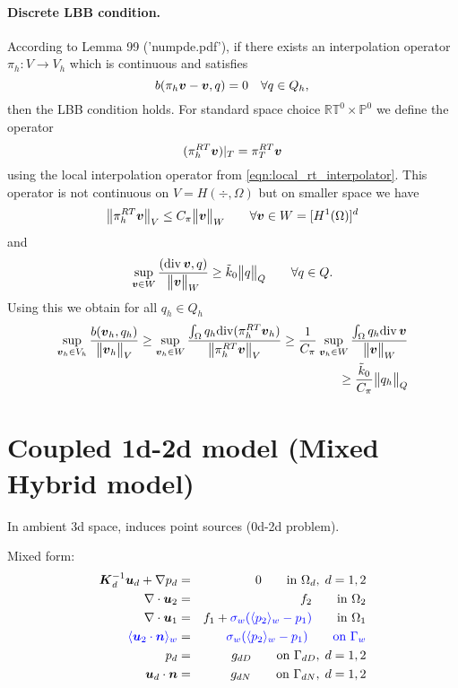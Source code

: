\paragraph{Discrete LBB condition.}
According to Lemma 99 ('numpde.pdf'), if there exists an interpolation operator
$\pi_h: V\rightarrow V_h$ which is continuous and satisfies
\begin{equation}
    b(\pi_h\mathbf{\boldsymbol{v}}- \mathbf{\boldsymbol{v}}, q) = 0 \quad \forall q\in Q_h,\\ 
\end{equation}
then the LBB condition holds.
For standard space choice $\mathbb{RT}^0\times\mathbb{P}^0$ we define
the operator 
\begin{equation}
    (\pi^{RT}_h \mathbf{\boldsymbol{v}})|_T = \pi^{RT}_T \mathbf{\boldsymbol{v}}
\end{equation}
using the local interpolation operator from \eqref{eqn:local_rt_interpolator}.
This operator is not continuous on $V=H(\div,\Omega)$ but on
smaller space we have
\begin{equation}
    \bigl\Vert\pi^{RT}_h \mathbf{\boldsymbol{v}}\bigr\Vert_V \leq C_\pi \bigl\Vert\mathbf{\boldsymbol{v}}\bigr\Vert_W \qquad \forall \mathbf{\boldsymbol{v}}\in W=[H^1(\Omega)]^d
\end{equation}
and
\begin{equation}
    \sup_{\mathbf{\boldsymbol{v}}\in W} \frac{({\rm div}\,\mathbf{\boldsymbol{v}}, q)}{\bigl\Vert\mathbf{\boldsymbol{v}}\bigr\Vert_W} \geq \tilde{k}_0 \bigl\Vert q\bigr\Vert_Q \qquad \forall q\in Q.
\end{equation}
Using this we obtain for all $q_h\in Q_h$
\begin{align}
    \sup_{\mathbf{\boldsymbol{v}}_h\in V_h} \frac{b(\mathbf{\boldsymbol{v}}_h,q_h)}{\bigl\Vert\mathbf{\boldsymbol{v}}_h\bigr\Vert_V} \geq
    \sup_{\mathbf{\boldsymbol{v}}_h\in W} \frac{\int_{\Omega} q_h {\rm div} (\pi^{RT}_h \mathbf{\boldsymbol{v}}_h)}{\bigl\Vert\pi^{RT}_h \mathbf{\boldsymbol{v}}\bigr\Vert_V} \geq
    \frac{1}{C_\pi} \sup_{\mathbf{\boldsymbol{v}}_h\in W} \frac{\int_{\Omega} q_h {\rm div}\,\mathbf{\boldsymbol{v}}}{\bigl\Vert\mathbf{\boldsymbol{v}}\bigr\Vert_W}
    \nonumber\\ \geq \frac{\tilde{k}_0}{C_\pi}\bigl\Vert q_h\bigr\Vert_Q
\end{align}




\section{Coupled 1d-2d model (Mixed Hybrid model)}

In ambient 3d space, induces point sources (0d-2d problem).
  
  Mixed form:
  \begin{eqnarray}
\mathbf{\boldsymbol{K}}_d^{-1}\mathbf{\boldsymbol{u}}_d + \nabla p_d &=& 0 \qquad \textrm{in } \Omega_d,\; d=1,2  \\
\nabla \cdot \mathbf{\boldsymbol{u}}_2 &=& f_2 \qquad \textrm{in } \Omega_2\\
\nabla \cdot \mathbf{\boldsymbol{u}}_1 &=& f_1 + {\color{blue}\sigma_w(\langle p_2\rangle_w-p_1)}\qquad \textrm{in } \Omega_1\\
\color{blue}\langle\mathbf{\boldsymbol{u}}_2 \cdot \mathbf{\boldsymbol{n}}\rangle_w &=& \color{blue}\sigma_w (\langle p_2\rangle_w - p_{1}) \qquad \textrm{on } \Gamma_w\\
p_d &=& g_{dD} \qquad \textrm{on } \Gamma_{dD},\; d=1,2 \\
\mathbf{\boldsymbol{u}}_d \cdot \mathbf{\boldsymbol{n}} &=& g_{dN} \qquad \textrm{on } \Gamma_{dN},\; d=1,2
  \end{eqnarray}
  
